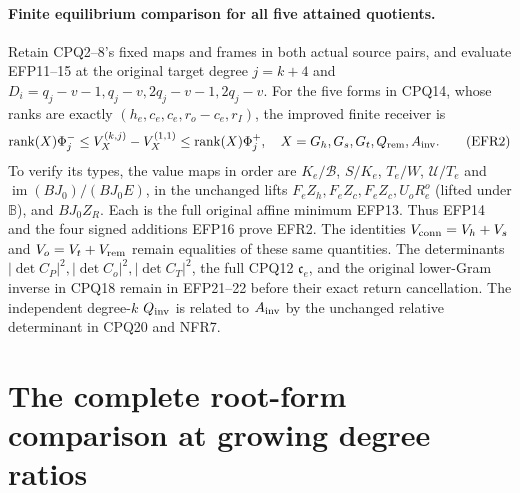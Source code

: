 \documentclass[11pt,a4paper]{article}
\begin{document}
\paragraph{Finite equilibrium comparison for all five attained quotients.}
Retain CPQ2--8's fixed maps and frames in both actual source pairs,
and evaluate EFP11--15 at the original target degree $j=k+4$ and
$D_i=q_j-v-1,q_j-v,2q_j-v-1,2q_j-v$.
For the five forms in CPQ14, whose ranks are exactly
$(h_e,c_e,c_e,r_o-c_e,r_I)$, the improved finite receiver is
\[
\operatorname{rank}(X)\Phi_j^-\le
 V_X^{(k,j)}-V_X^{(1,1)}
 \le\operatorname{rank}(X)\Phi_j^+,
\quad X=G_h,G_s,G_t,Q_{\rm rem},A_{\rm inv}.
\tag{EFR2}
\]
To verify its types, the value maps in order are
$K_e/\mathscr B$, $S/K_e$, $T_e/W$, $\mathcal U/T_e$ and
$\operatorname{im}(BJ_0)/(BJ_0E)$, in the unchanged lifts
$F_eZ_h,F_eZ_c,F_eZ_c,U_oR_e^o$ (lifted under $\mathbb B$), and
$BJ_0Z_R$. Each is the full original affine minimum EFP13.
Thus EFP14 and the four signed additions EFP16 prove EFR2.
The identities $V_{\rm conn}=V_h+V_s$ and $V_o=V_t+V_{\rm rem}$
remain equalities of these same quantities. The determinants
$|\det C_P|^2,|\det C_o|^2,|\det C_T|^2$, the full CPQ12
$\mathfrak c_e$, and the original lower-Gram inverse in CPQ18
remain in EFP21--22 before their exact return cancellation.
The independent degree-$k$ $Q_{\rm inv}$ is related to $A_{\rm inv}$
by the unchanged relative determinant in CPQ20 and NFR7.



\endgroup
\label{MTBUILD:CPQ_COMPLETE_PREREQUISITE:end}

\clearpage
\label{MTBUILD:GRF_COMPLETE_PREREQUISITE:start}
\clearpage
\label{GRBUILD:GRF_FULL_FORM_PROOF_BODY:start}
\begingroup
\newtheorem{grftheorem}{Theorem}
\newtheorem{grflemma}[grftheorem]{Lemma}
\section{The complete root-form comparison at growing degree ratios}
\label{GRF:section}
\end{document}
